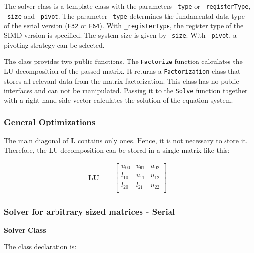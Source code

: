 The solver class is a template class with the parameters \texttt{_type} or \texttt{_registerType}, \texttt{_size} and \texttt{_pivot}.
The parameter \texttt{_type} determines the fundamental data type of the serial version (\texttt{F32} or \texttt{F64}). 
With \texttt{_registerType}, the register type of the SIMD version is specified. 
The system size is given by \texttt{_size}.
With \texttt{_pivot}, a pivoting strategy can be selected.

The class provides two public functions.
The \texttt{Factorize} function calculates the LU decomposition of the passed matrix. 
It returns a \texttt{Factorization} class that stores all relevant data from the matrix factorization.
This class has no public interfaces and can not be manipulated.
Passing it to the \texttt{Solve} function together with a right-hand side vector calculates the solution of the equation system.


\subsubsection{General Optimizations}
\label{sec:LUOptimizations}

The main diagonal of $\mathbf{L}$ contains only ones.
Hence, it is not necessary to store it.
Therefore, the LU decomposition can be stored in a single matrix like this:

\begin{align}
\mathbf{LU} 
& =
\begin{bmatrix}
u_{00} &u_{01} &u_{02}\\
l_{10} &u_{11} &u_{12}\\
l_{20} &l_{21} &u_{22}\\
\end{bmatrix}
\end{align}

\newpage
\subsubsection{Solver for arbitrary sized matrices - Serial}

\vspace{0.5cm}
\textbf{Solver Class}
\vspace{0.5cm}

The class declaration is:

